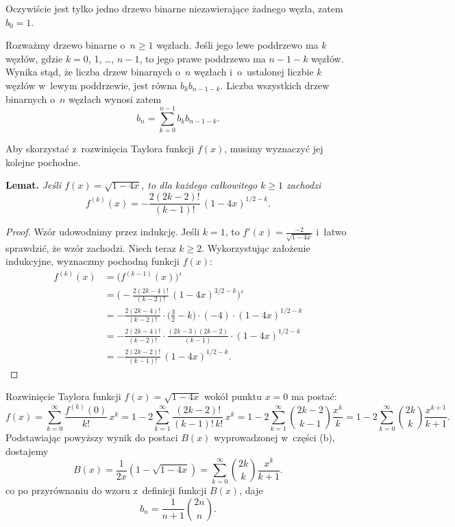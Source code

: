 \subproblem %


\subproblem %
Oczywiście jest tylko jedno drzewo binarne niezawierające żadnego węzła, zatem $b_0=1$.

Rozważmy drzewo binarne o~$n\ge1$ węzłach.
Jeśli jego lewe poddrzewo ma $k$ węzłów, gdzie $k=0$, 1, \dots, $n-1$, to jego prawe poddrzewo ma $n-1-k$ węzłów.
Wynika stąd, że liczba drzew binarnych o~$n$ węzłach i~o~ustalonej liczbie $k$ węzłów w~lewym poddrzewie, jest równa $b_kb_{n-1-k}$.
Liczba wszystkich drzew binarnych o~$n$ węzłach wynosi zatem
\[
	b_n = \sum_{k=0}^{n-1}b_kb_{n-1-k}.
\]

\subproblem %
\subproblem %

\noindent Aby skorzystać z~rozwinięcia Taylora funkcji $f(x)$, musimy wyznaczyć jej kolejne pochodne.

\medskip
\noindent\textsf{\textbf{Lemat.}} \textit{Jeśli\/ $f(x)=\sqrt{1-4x}$, to dla\/ każdego całkowitego $k\ge1$ zachodzi
\[
	f^{(k)}(x) = -\frac{2(2k-2)!}{(k-1)!}\,(1-4x)^{1/2-k}.
\]
}
\begin{proof}
Wzór udowodnimy przez indukcję.
Jeśli $k=1$, to $f'(x)=\frac{-2}{\sqrt{1-4x}}$ i~łatwo sprawdzić, że wzór zachodzi.
Niech teraz $k\ge2$.
Wykorzystując założenie indukcyjne, wyznaczmy  pochodną funkcji $f(x)$:
\begin{align*}
	f^{(k)}(x) &= \bigl(f^{(k-1)}(x)\bigr)' \\
	&= \biggl(-\frac{2(2k-4)!}{(k-2)!}\,(1-4x)^{3/2-k}\biggr)' \\[1mm]
	&= -\frac{2(2k-4)!}{(k-2)!}\cdot\biggl(\frac{3}{2}-k\biggr)\cdot(-4)\cdot(1-4x)^{1/2-k} \\[1mm]
	&= -\frac{2(2k-4)!}{(k-2)!}\cdot\frac{(2k-3)(2k-2)}{(k-1)}\cdot(1-4x)^{1/2-k} \\[1mm]
	&= -\frac{2(2k-2)!}{(k-1)!}\,(1-4x)^{1/2-k}.
\end{align*}
\end{proof}

Rozwinięcie Taylora funkcji $f(x)=\sqrt{1-4x}$ wokół punktu $x=0$ ma postać:
\[
	f(x) = \sum_{k=0}^\infty\frac{f^{(k)}(0)}{k!}\,x^k = 1-2\sum_{k=1}^\infty\frac{(2k-2)!}{(k-1)!\,k!}\,x^k = 1-2\sum_{k=1}^\infty\binom{2k-2}{k-1}\frac{x^k}{k} = 1-2\sum_{k=0}^\infty\binom{2k}{k}\frac{x^{k+1}}{k+1}.
\]
Podstawiając powyższy wynik do postaci $B(x)$ wyprowadzonej w~części (b), dostajemy
\[
	B(x) = \frac{1}{2x}(1-\sqrt{1-4x}) = \sum_{k=0}^\infty\binom{2k}{k}\frac{x^k}{k+1}.
\]
co po przyrównaniu do wzoru z~definicji funkcji $B(x)$, daje
\[
	b_n = \frac{1}{n+1}\binom{2n}{n}.
\]


